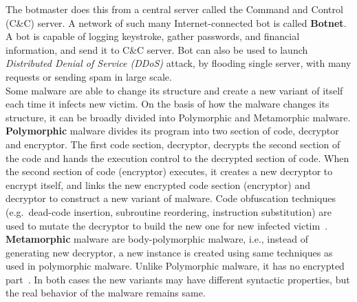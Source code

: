 The botmaster does this from a central server called the Command and Control (C\&C) server.
A network of such many Internet-connected bot is called \textbf{Botnet}.
A bot is capable of logging keystroke, gather passwords, and financial information, and send it to C\&C server.
Bot can also be used to launch \emph{Distributed Denial of Service (DDoS)} attack, by flooding single server, with many requests or sending spam in large scale.\\
Some malware are able to change its structure and create a new variant of itself each time it infects new victim.
On the basis of how the malware changes its structure, it can be broadly divided into Polymorphic and Metamorphic malware.
\textbf{Polymorphic} malware divides its program into two section of code, decryptor and encryptor.
The first code section, decryptor, decrypts the second section of the code and hands the execution control to the decrypted section of code.
When the second section of code (encryptor) executes, it creates a new decryptor to encrypt itself, and links the new encrypted code section (encryptor) and decryptor to construct a new variant of malware.
Code obfuscation techniques (e.g.\ dead-code insertion, subroutine reordering, instruction substitution) are used to mutate the decryptor to build the new one for new infected victim~\cite[]{rad2011evolution}.
\textbf{Metamorphic} malware are body-polymorphic malware, i.e., instead of generating new decryptor, a new instance is created using same techniques as used in polymorphic malware.
Unlike Polymorphic malware, it has no encrypted part~\cite[]{rad2012camouflage}.
In both cases the new variants may have different syntactic properties, but the real behavior of the malware remains same.\\

